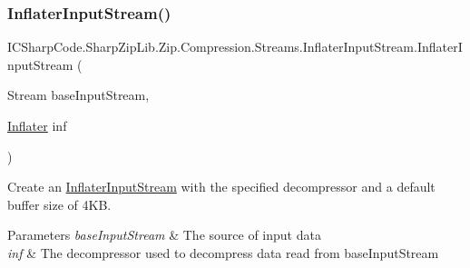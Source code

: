 \subsubsection{\texorpdfstring{Inflater\+Input\+Stream()}{InflaterInputStream()}\hspace{0.1cm}{\footnotesize\ttfamily [2/6]}}
{\footnotesize\ttfamily I\+C\+Sharp\+Code.\+Sharp\+Zip\+Lib.\+Zip.\+Compression.\+Streams.\+Inflater\+Input\+Stream.\+Inflater\+Input\+Stream (\begin{DoxyParamCaption}\item[{Stream}]{base\+Input\+Stream,  }\item[{\hyperlink{class_i_c_sharp_code_1_1_sharp_zip_lib_1_1_zip_1_1_compression_1_1_inflater}{Inflater}}]{inf }\end{DoxyParamCaption})\hspace{0.3cm}{\ttfamily [inline]}}



Create an \hyperlink{class_i_c_sharp_code_1_1_sharp_zip_lib_1_1_zip_1_1_compression_1_1_streams_1_1_inflater_input_stream}{Inflater\+Input\+Stream} with the specified decompressor and a default buffer size of 4\+KB. 


\begin{DoxyParams}{Parameters}
{\em base\+Input\+Stream} & The source of input data \\
\hline
{\em inf} & The decompressor used to decompress data read from base\+Input\+Stream \\
\hline
\end{DoxyParams}
\mbox{\label{class_i_c_sharp_code_1_1_sharp_zip_lib_1_1_zip_1_1_compression_1_1_streams_1_1_inflater_input_stream_af988bfe68d18362c690e6f7cb0e7c0eb}} 
